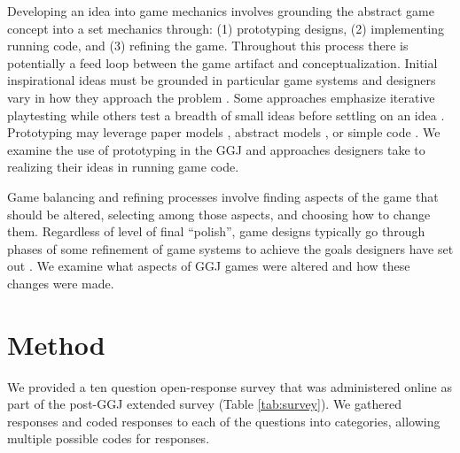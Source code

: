 \documentclass{sig-alternate}
\begin{document}
Developing an idea into game mechanics involves grounding the abstract game concept into a set mechanics through: (1) prototyping designs, (2) implementing running code, and (3) refining the game. Throughout this process there is potentially a feed loop between the game artifact and conceptualization. Initial inspirational ideas must be grounded in particular game systems and designers vary in how they approach the problem \cite{gabler2005:7day-prototype} \cite{manker2011:prototyping} \cite{nelson2009:reqanal}. Some approaches emphasize iterative playtesting \cite{fullerton2008:playcentric} \cite{schell2008:gamedesign} while others test a breadth of small ideas before settling on an idea \cite{gabler2005:7day-prototype}. Prototyping may leverage paper models \cite{manker2011:prototyping}, abstract models \cite{nelson2009:reqanal} \cite{dormans2011:machinations2}, or simple code \cite{gabler2005:7day-prototype}. We examine the use of prototyping in the GGJ and approaches designers take to realizing their ideas in running game code.

Game balancing and refining processes involve finding aspects of the game that should be altered, selecting among those aspects, and choosing how to change them. Regardless of level of final ``polish'', game designs typically go through phases of some refinement of game systems to achieve the goals designers have set out \cite{schell2008:gamedesign} \cite{fullerton2008:playcentric}. We examine what aspects of GGJ games were altered and how these changes were made.

\section{Method}
We provided a ten question open-response survey that was administered online as part of the post-GGJ extended survey (Table \ref{tab:survey}). We gathered responses and coded responses to each of the questions into categories, allowing multiple possible codes for responses.
\end{document}
